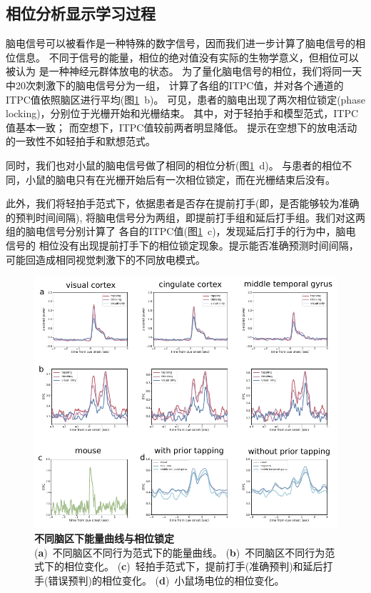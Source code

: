 \subsection{相位分析显示学习过程}
脑电信号可以被看作是一种特殊的数字信号，因而我们进一步计算了脑电信号的相位信息。
不同于信号的能量，相位的绝对值没有实际的生物学意义，但相位可以被认为
是一种神经元群体放电的状态。%
为了量化脑电信号的相位，我们将同一天中20次刺激下的脑电信号分为一组，
计算了各组的ITPC值，并对各个通道的ITPC值依照脑区进行平均(图\ref{fig:ephys_network}~b)。
可见，患者的脑电出现了两次相位锁定(phase locking)，分别位于光栅开始和光栅结束。
其中，对于轻拍手和模型范式，ITPC值基本一致；
而空想下，ITPC值较前两者明显降低。%
提示在空想下的放电活动的一致性不如轻拍手和默想范式。

同时，我们也对小鼠的脑电信号做了相同的相位分析(图\ref{fig:ephys_network}~d)。
与患者的相位不同，小鼠的脑电只有在光栅开始后有一次相位锁定，而在光栅结束后没有。

此外，我们将轻拍手范式下，依据患者是否存在提前打手(即，是否能够较为准确的预判时间间隔),
将脑电信号分为两组，即提前打手组和延后打手组。我们对这两组的脑电信号分别计算了
各自的ITPC值(图\ref{fig:ephys_network}~c)，发现延后打手的行为中，脑电信号的
相位没有出现提前打手下的相位锁定现象。提示能否准确预测时间间隔，
可能回造成相同视觉刺激下的不同放电模式。


\begin{figure}[h]
    \centering
    \includegraphics[width=\textwidth]{src/figures/ephys_network.pdf}
    \caption{\textbf{不同脑区下能量曲线与相位锁定}\\
    (\textbf{a})~不同脑区不同行为范式下的能量曲线。
    (\textbf{b})~不同脑区不同行为范式下的相位变化。
    (\textbf{c})~轻拍手范式下，提前打手(准确预判)和延后打手(错误预判)的相位变化。
    (\textbf{d})~小鼠场电位的相位变化。}
    \label{fig:ephys_network}
\end{figure}

